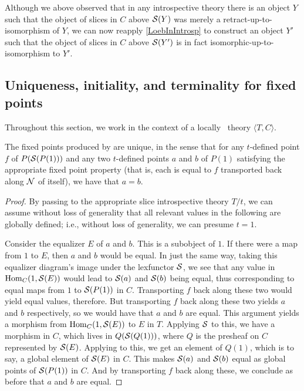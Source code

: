 \begin{observation}
Although we above observed that in any introspective theory there is an object $Y$ such that the object of slices in $C$ above $\mathcal{S}(Y)$ was merely a retract-up-to-isomorphism of $Y$, we can now reapply \cref{LoebInIntrosp} to construct an object $Y'$ such that the object of slices in $C$ above $\mathcal{S}(Y')$ is in fact isomorphic-up-to-isomorphism to $Y'$. 
\end{observation}

\subsection{Uniqueness, initiality, and terminality for fixed points}
Throughout this section, we work in the context of a locally \Loeb\ theory $\langle T, C \rangle$.

\begin{theorem}\label{UniqueFixedPoints}
The fixed points produced by  are unique, in the sense that for any $t$-defined point $f$ of $P(\mathcal{S}(P(1)))$ and any two $t$-defined points $a$ and $b$ of $P(1)$ satisfying the appropriate fixed point property (that is, each is equal to $f$ transported back along $\mathcal{N}$ of itself), we have that $a = b$.
\end{theorem}
\begin{proof}
By passing to the appropriate slice introspective theory $T/t$, we can assume without loss of generality that all relevant values in the following are globally defined; i.e., without loss of generality, we can presume $t = 1$.

Consider the equalizer $E$ of $a$ and $b$. This is a subobject of $1$. If there were a map from $1$ to $E$, then $a$ and $b$ would be equal. In just the same way, taking this equalizer diagram's image under the lexfunctor $\mathcal{S}$, we see that any value in $\operatorname{Hom}_C(1, \mathcal{S}(E))$ would lead to $\mathcal{S}(a)$ and $\mathcal{S}(b)$ being equal, thus corresponding to equal maps from $1$ to $\mathcal{S}(P(1))$ in $C$. Transporting $f$ back along these two would yield equal values, therefore. But transporting $f$ back along these two yields $a$ and $b$ respectively, so we would have that $a$ and $b$ are equal. This argument yields a morphism from $\operatorname{Hom}_C(1, \mathcal{S}(E))$ to $E$ in $T$. Applying $\mathcal{S}$ to this, we have a morphism in $C$, which lives in $Q(\mathcal{S}(Q(1)))$, where $Q$ is the presheaf on $C$ represented by $\mathcal{S}(E)$. Applying  to this, we get an element of $Q(1)$, which is to say, a global element of $\mathcal{S}(E)$ in $C$. This makes $\mathcal{S}(a)$ and $\mathcal{S}(b)$ equal as global points of $\mathcal{S}(P(1))$ in $C$. And by transporting $f$ back along these, we conclude as before that $a$ and $b$ are equal. 
\end{proof}

